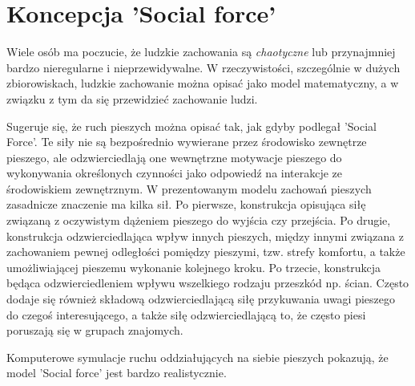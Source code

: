 \chapter{Koncepcja 'Social force'}
\hspace{4ex}Wiele osób ma poczucie, że ludzkie zachowania są {\it chaotyczne} lub przynajmniej bardzo nieregularne i nieprzewidywalne. W rzeczywistości, szczególnie w dużych zbiorowiskach, ludzkie zachowanie można opisać jako model matematyczny, a w związku z tym da się przewidzieć zachowanie ludzi.
\par \medskip
Sugeruje się, że ruch pieszych można opisać tak, jak gdyby podlegał 'Social Force'. Te siły nie są bezpośrednio wywierane przez środowisko zewnętrze pieszego, ale odzwierciedlają one wewnętrzne motywacje pieszego do wykonywania określonych czynności jako odpowiedź na interakcje ze środowiskiem zewnętrznym. W prezentowanym modelu zachowań pieszych zasadnicze znaczenie ma kilka sił. Po pierwsze, konstrukcja opisująca siłę związaną z oczywistym dążeniem pieszego do wyjścia czy przejścia. Po drugie, konstrukcja odzwierciedlająca wpływ innych pieszych, między innymi związana z zachowaniem pewnej odległości pomiędzy pieszymi, tzw. strefy komfortu, a także umożliwiającej pieszemu wykonanie kolejnego kroku. Po trzecie, konstrukcja będąca odzwierciedleniem wpływu wszelkiego rodzaju przeszkód np. ścian. Często dodaje się również składową odzwierciedlającą siłę przykuwania uwagi pieszego do czegoś interesującego, a także siłę odzwierciedlającą to, że często piesi poruszają się w grupach znajomych.

Komputerowe symulacje ruchu oddziałujących na siebie pieszych pokazują, że model 'Social force' jest bardzo realistycznie.

